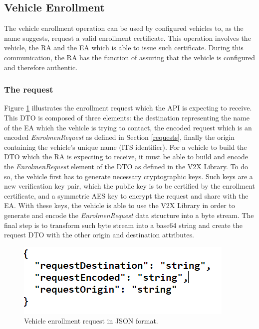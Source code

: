 \subsection{Vehicle Enrollment}
The vehicle enrollment operation can be used by configured vehicles to, as the name suggests, request a valid enrollment certificate. This operation involves the vehicle, the RA and the EA which is able to issue such certificate. During this communication, the RA has the function of assuring that the vehicle is configured and therefore authentic.

\subsubsection{The request}
Figure \ref{fig:enrol_req} illustrates the enrollment request which the API is expecting to receive. This DTO is composed of three elements: the destination representing the name of the EA which the vehicle is trying to contact, the encoded request which is an encoded \textit{EnrolmenRequest} as defined in Section \ref{requests}, finally the origin containing the vehicle's unique name (ITS identifier). For a vehicle to build the DTO which the RA is expecting to receive, it must be able to build and encode the \textit{EnrolmenRequest} element of the DTO as defined in the V2X Library. To do so, the vehicle first has to generate necessary cryptographic keys. Such keys are a new verification key pair, which the public key is to be certified by the enrollment certificate, and a symmetric AES key to encrypt the request and share with the EA. With these keys, the vehicle is able to use the V2X Library in order to generate and encode the \textit{EnrolmenRequest} data structure into a byte stream. The final step is to transform such byte stream into a base64 string and create the request DTO with the other origin and destination attributes.

\begin{figure}
	\centering
	\includegraphics[width=0.5
	\textwidth]{Figures/enrol_req}
	\caption{\label{fig:enrol_req}Vehicle enrollment request in JSON format.}
\end{figure}

